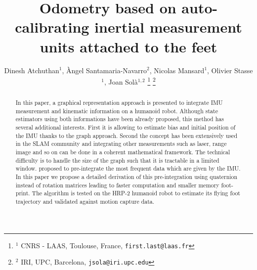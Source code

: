 \documentclass[letterpaper, 10 pt, conference]{ieeeconf}  %
\title{\LARGE \bf
Odometry based on auto-calibrating inertial measurement units attached to the feet
}
\author{Dinesh Atchuthan$^{1}$, \`Angel Santamaria-Navarro$^{2}$, Nicolas Mansard$^1$, Olivier Stasse$^1$, Joan Sol\`a$^{1,2}$%
\thanks{$^{1}$ CNRS - LAAS, Toulouse, France, \tt {\small first.last@laas.fr}}%
\thanks{$^{2}$ IRI, UPC, Barcelona, \tt{\small jsola@iri.upc.edu}}
}
\begin{document}
\maketitle
\thispagestyle{empty}
\pagestyle{empty}

\begin{abstract}
In this paper, a graphical representation approach is presented to integrate 
IMU measurement and kinematic information on a humanoid robot. Although state estimators using both
informations \cite{Johnson:jof:2016,Fallon:ichr:2014} have been already proposed, this method has several additional interests.
First it is allowing to estimate bias and initial position of the IMU thanks to the graph
approach. Second the concept has been extensively used in the SLAM community and integrating 
other measurements such as laser, range image and so on can be done in a coherent mathematical framework.
The technical difficulty is to handle the size of the graph such that it is tractable in a limited window.
\cite{forster2015imu} proposed to pre-integrate the most frequent data which are given by the IMU.
In this paper we propose a detailed derivation of this pre-integration using quaternion instead
of rotation matrices leading to faster computation and smaller memory foot-print.
The algorithm is tested on the HRP-2 humanoid robot to estimate
its flying foot trajectory and validated against motion capture data.
\end{abstract}











\end{document}
